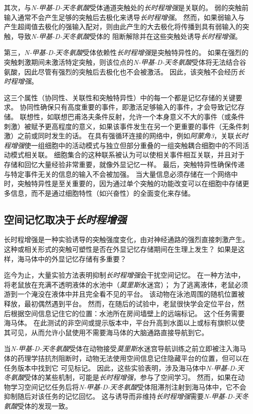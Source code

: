 其次，与\textit{N-甲基-D-天冬氨酸}受体通道突触处的\textit{长时程增强}是关联的。
弱的突触前输入通常不会产生足够的突触后去极化来诱导\textit{长时程增强}。
然而，如果弱输入与产生超阈值去极化的强输入配对，则由此产生的大去极化将传播到具有弱输入的突触，导致\textit{N-甲基-D-天冬氨酸}受体的  阻断解除并在这些突触处诱导\textit{长时程增强}。


第三，\textit{N-甲基-D-天冬氨酸}受体依赖性\textit{长时程增强}是突触特异性的。
如果在强烈的突触刺激期间未激活特定突触，则该位点的\textit{N-甲基-D-天冬氨酸}受体将无法结合谷氨酸，因此尽管有强烈的突触后去极化也不会被激活。
因此，该突触不会经历\textit{长时程增强}。


这三个属性（协同性、关联性和突触特异性）中的每一个都是记忆存储的关键要求。
协同性确保只有高度重要的事件，即激活足够输入的事件，才会导致记忆存储。
联想性，如联想巴甫洛夫条件反射，允许一个本身意义不大的事件（或条件刺激）被赋予更高程度的意义，如果该事件发生在另一个更重要的事件（无条件刺激）之前或同时发生的话。
在具有强循环连接的网络中，例如\textit{阿蒙角3}，关联\textit{长时程增强}使一组细胞中的活动模式与独立但部分重叠的一组突触耦合细胞中的不同活动模式相关联。
细胞集合的这种联系被认为可以使相关事件相互关联，并且对于存储和回忆大量经验非常重要，就像外显记忆一样。
最后，突触特异性确保传递与特定事件无关的信息的输入不会被加强。
当大量信息必须存储在一个网络中时，突触特异性是至关重要的，因为通过单个突触的功能改变可以在细胞中存储更多信息，而不是通过细胞特性（如兴奋性）的全面变化来存储。



\subsection{空间记忆取决于\textit{长时程增强}}

长时程增强是一种实验诱导的突触强度变化，由对神经通路的强烈直接刺激产生。
这种或相关形式的突触可塑性是否在外显记忆存储期间在生理上发生？
如果是这样，海马体中的外显记忆存储有多重要？


迄今为止，大量实验方法表明抑制\textit{长时程增强}会干扰空间记忆。
在一种方法中，将老鼠放在充满不透明液体的水池中（\textit{莫里斯}水迷宫）；
为了逃离液体，老鼠必须游到一个淹没在液体中并且完全看不见的平台。
该动物在泳池周围的随机位置被释放，最初偶然遇到平台。
然而，在随后的试验中，老鼠很快学会定位平台，然后根据空间信息记住它的位置：水池所在房间墙壁上的远端标记。
这个任务需要海马体。
在此测试的非空间或提示版本中，平台升高到水面以上或标有旗帜以使其可见，从而允许小鼠使用不需要海马体的大脑通路直接导航到它。


当\textit{N-甲基-D-天冬氨酸}受体在动物接受\textit{莫里斯}水迷宫导航训练之前立即被注入海马体的药理学拮抗剂阻断时，动物无法使用空间信息记住隐藏平台的位置，但可以在任务版本中找到它 可见标记。
因此，这些实验表明，涉及海马体中\textit{N-甲基-D-天冬氨酸}受体的某些机制，可能是\textit{长时程增强}，参与了空间学习。
然而，如果在动物学习空间记忆任务后将\textit{N-甲基-D-天冬氨酸}受体阻滞剂注射到海马体中，它不会抑制随后对该任务的记忆回忆。
这与诱导而非维持\textit{长时程增强}需要\textit{N-甲基-D-天冬氨酸}受体的发现一致。


